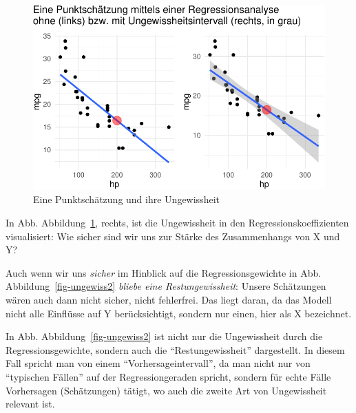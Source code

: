 \documentclass[
  a4paper,
  DIV=11]{scrreprt}
\theoremstyle{definition}
\theoremstyle{remark}
\begin{document}
\begin{figure}

{\centering \includegraphics{./Inferenz_files/figure-pdf/fig-punktschaetzer2-1.pdf}

}

\caption{\label{fig-punktschaetzer2}Eine Punktschätzung und ihre
Ungewissheit}

\end{figure}

In Abb. Abbildung~\ref{fig-punktschaetzer2}, rechts, ist die
Ungewissheit in den Regressionskoeffizienten visualisiert: Wie sicher
sind wir uns zur Stärke des Zusammenhangs von X und Y?

Auch wenn wir uns \emph{sicher} im Hinblick auf die Regressionsgewichte
in Abb. Abbildung~\ref{fig-ungewiss2} \emph{bliebe eine
Restungewissheit}: Unsere Schätzungen wären auch dann nicht sicher,
nicht fehlerfrei. Das liegt daran, da das Modell nicht alle Einflüsse
auf Y berücksichtigt, sondern nur einen, hier als X bezeichnet.

In Abb. Abbildung~\ref{fig-ungewiss2} ist nicht nur die Ungewissheit
durch die Regressionsgewichte, sondern auch die ``Restungewissheit''
dargestellt. In diesem Fall spricht man von einem
``Vorhersageintervall'', da man nicht nur von ``typischen Fällen'' auf
der Regressiongeraden spricht, sondern für echte Fälle Vorhersagen
(Schätzungen) tätigt, wo auch die zweite Art von Ungewissheit relevant
ist.
\end{document}
